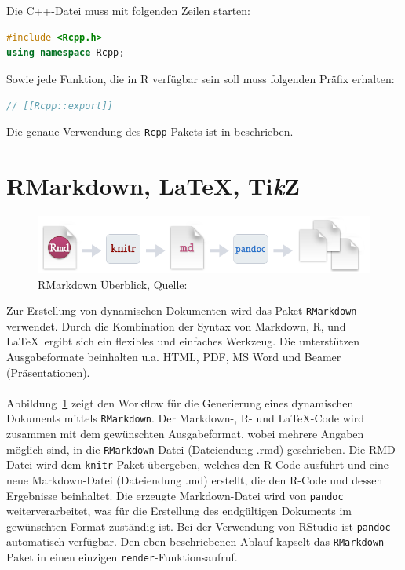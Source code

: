 \\
\\
Die C++-Datei muss mit folgenden Zeilen starten:
\begin{lstlisting}[language=C++, numbers=none, basicstyle=\ttfamily]
#include <Rcpp.h>
using namespace Rcpp;
\end{lstlisting}
Sowie jede Funktion, die in R verfügbar sein soll muss folgenden Präfix erhalten:
\begin{lstlisting}[language=C++, numbers=none, basicstyle=\ttfamily]
// [[Rcpp::export]]
\end{lstlisting}
Die genaue Verwendung des \texttt{Rcpp}-Pakets ist in \cite{wickham2015advanced} beschrieben.
\section{RMarkdown, \LaTeX, Ti\textit{k}Z}
\label{kapitel:rmarkdown}
\begin{figure}[t]
\centering
\includegraphics[width=\ScaleIfNeeded]{abbildungen/rmarkdown}
\caption[RMarkdown Überblick]{RMarkdown Überblick, Quelle: \cite{rmarkdown}}
\label{abb:rmarkdown}
\end{figure}
Zur Erstellung von dynamischen Dokumenten wird das Paket \texttt{RMarkdown} verwendet. Durch die Kombination der Syntax von Markdown, R, und \LaTeX\ ergibt sich ein flexibles und einfaches Werkzeug. Die unterstützen Ausgabeformate beinhalten u.a. HTML, PDF, MS Word und Beamer (Präsentationen).
\\
\\
Abbildung~\ref{abb:rmarkdown} zeigt den Workflow für die Generierung eines dynamischen Dokuments mittels \texttt{RMarkdown}. Der Markdown-, R- und \LaTeX -Code wird zusammen mit dem gewünschten Ausgabeformat, wobei mehrere Angaben möglich sind, in die \texttt{RMarkdown}-Datei (Dateiendung .rmd) geschrieben. Die RMD-Datei wird dem \texttt{knitr}-Paket übergeben, welches den R-Code ausführt und eine neue Markdown-Datei (Dateiendung .md) erstellt, die den R-Code und dessen Ergebnisse beinhaltet. Die erzeugte Markdown-Datei wird von \texttt{pandoc} weiterverarbeitet, was für die Erstellung des endgültigen Dokuments im gewünschten Format zuständig ist. Bei der Verwendung von RStudio ist \texttt{pandoc} automatisch verfügbar. Den eben beschriebenen Ablauf kapselt das \texttt{RMarkdown}-Paket in einen einzigen \texttt{render}-Funktionsaufruf.
